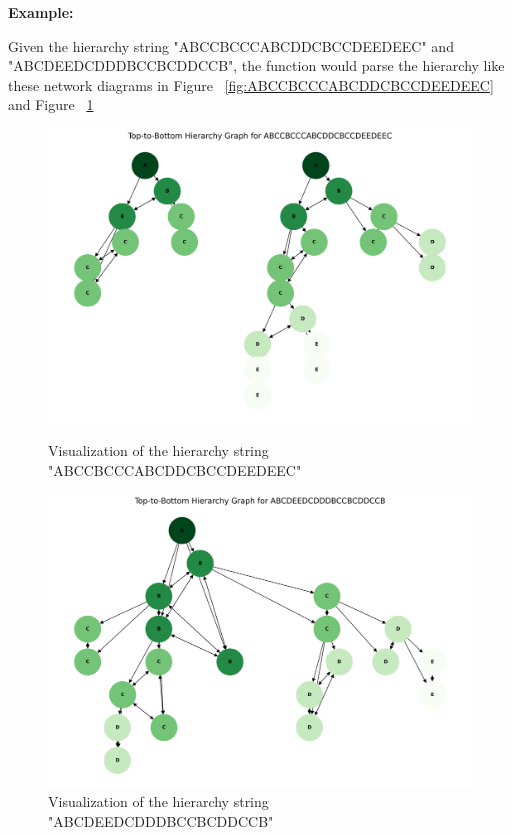 \textbf{Example:}

Given the hierarchy string "ABCCBCCCABCDDCBCCDEEDEEC" and "ABCDEEDCDDDBCCBCDDCCB", the function would parse the hierarchy like these network diagrams in Figure ~\ref{fig:ABCCBCCCABCDDCBCCDEEDEEC} and Figure ~\ref{fig:ABCDEEDCDDDBCCBCDDCCB}

\begin{figure}[h]
    \centering
    \begin{minipage}{0.49\linewidth}
        \centering
        \includegraphics[width=\linewidth]{img/section_implement/ABCCBCCCABCDDCBCCDEEDEEC.png}
        \caption{Visualization of the hierarchy string "ABCCBCCCABCDDCBCCDEEDEEC"}
        \label{fig:ABCCBCCCABCDDCBCCDEEDEEC}
    \end{minipage}
    \hfill
    \begin{minipage}{0.49\linewidth}
        \centering
        \includegraphics[width=\linewidth]{img/section_implement/ABCDEEDCDDDBCCBCDDCCB.png}
        \caption{Visualization of the hierarchy string "ABCDEEDCDDDBCCBCDDCCB"}
        \label{fig:ABCDEEDCDDDBCCBCDDCCB}
    \end{minipage}
\end{figure}

